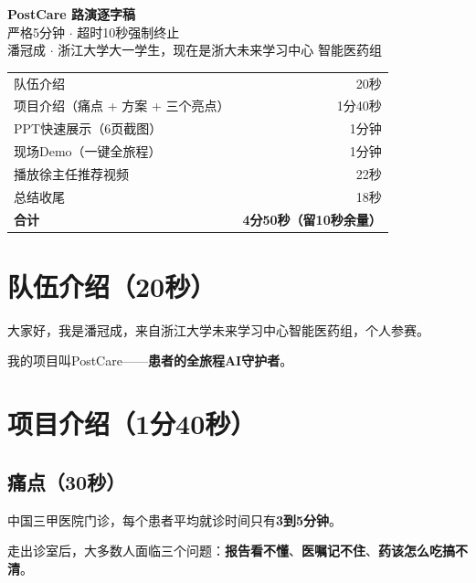 \documentclass[UTF8, a4paper, 11pt]{ctexart}
\begin{document}
\begin{center}
{\color{Navy}\Huge\bfseries\sffamily PostCare 路演逐字稿}\\[8pt]
{\large\color{gray} 严格5分钟 $\cdot$ 超时10秒强制终止}\\[4pt]
{\color{ThemeBlue} 潘冠成 $\cdot$ 浙江大学大一学生，现在是浙大未来学习中心 智能医药组}
\end{center}

\vspace{1em}

\begin{infobox}[时间分配]
\begin{tabularx}{\textwidth}{Xr}
队伍介绍 & 20秒 \\
项目介绍（痛点 + 方案 + 三个亮点） & 1分40秒 \\
PPT快速展示（6页截图） & 1分钟 \\
现场Demo（一键全旅程） & 1分钟 \\
播放徐主任推荐视频 & 22秒 \\
总结收尾 & 18秒 \\
\midrule
\textbf{合计} & \textbf{4分50秒（留10秒余量）} \\
\end{tabularx}
\end{infobox}

\section{队伍介绍（20秒）}

大家好，我是潘冠成，来自浙江大学未来学习中心智能医药组，个人参赛。

我的项目叫PostCare——\textbf{患者的全旅程AI守护者}。

\section{项目介绍（1分40秒）}

\subsection{痛点（30秒）}

中国三甲医院门诊，每个患者平均就诊时间只有\textbf{3到5分钟}。

走出诊室后，大多数人面临三个问题：\textbf{报告看不懂}、\textbf{医嘱记不住}、\textbf{药该怎么吃搞不清}。
\end{document}
